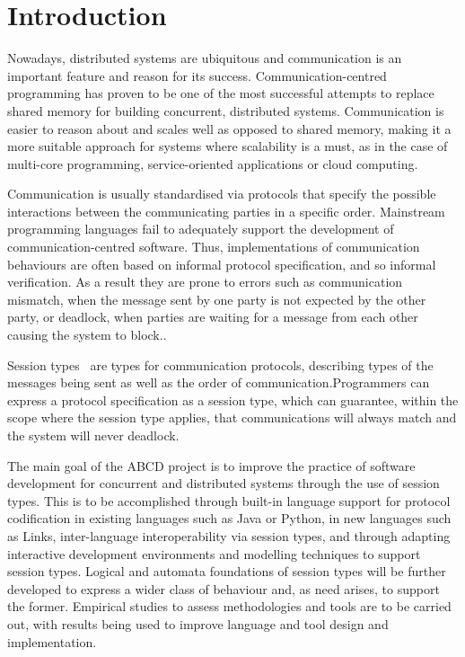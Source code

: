 \section{Introduction}

Nowadays, distributed systems are ubiquitous and communication is an important feature and reason for its success. Communication-centred programming has proven to be one of the most successful attempts to replace shared memory for building concurrent, distributed systems. Communication is easier to reason about and scales well as opposed to shared memory, making it a more suitable approach for systems where scalability is a must, as in the case of multi-core programming, service-oriented applications or cloud computing\cite{abcd}.

Communication is usually standardised via protocols that specify the possible interactions between the communicating parties in a specific order. Mainstream programming languages fail to adequately support the development of communication-centred software. Thus, implementations of communication behaviours are often based on informal protocol specification, and so informal verification. As a result they are prone to errors such as communication mismatch, when the message sent by one party is not expected by the other party, or deadlock, when parties are waiting for a message from each other causing the system to block.\cite{abcd}.

Session types~\cite{HondaK:typdi, HondaK:intblt1, HondaK:lanptd} are types for communication protocols, describing types of the messages being sent as well as the order of communication.Programmers can express a protocol specification as a session type, which can guarantee, within the scope where the session type applies, that communications will always match and the system will never deadlock.

The main goal of the ABCD project\cite{abcd} is to improve the practice of software development for concurrent and distributed systems through the use of session types. This is to be accomplished through built-in language support for protocol codification in existing languages such as Java or Python, in new languages such as Links\cite{links}, inter-language interoperability via session types, and through adapting interactive development environments and modelling techniques to support session types. Logical and automata foundations of session types will be further developed to express a wider class of behaviour and, as need arises, to support the former. Empirical studies to assess methodologies and tools are to be carried out, with results being used to improve language and tool design and implementation.

